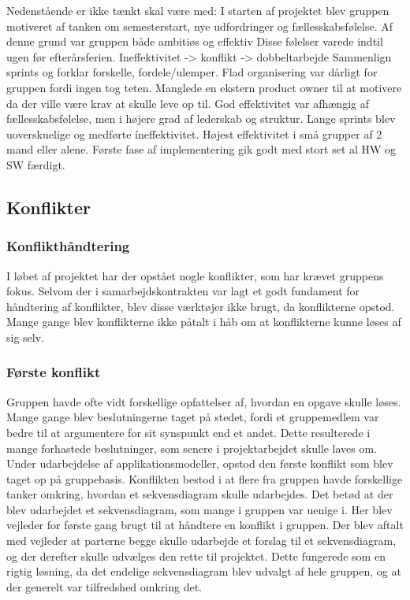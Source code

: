 Nedenstående er ikke tænkt skal være med:
I starten af projektet blev gruppen motiveret af tanken om semesterstart, nye udfordringer og fællesskabsfølelse. Af denne grund var gruppen både ambitiøs og effektiv
Disse følelser varede indtil ugen før efterårsferien.
Ineffektivitet -> konflikt -> dobbeltarbejde
Sammenlign sprints og forklar forskelle, fordele/ulemper.
Flad organisering var dårligt for gruppen fordi ingen tog teten. Manglede en ekstern product owner til at motivere da der ville være krav at skulle leve op til. 
God effektivitet var afhængig af fællesskabsfølelse, men i højere grad af lederskab og struktur.
Lange sprints blev uoverskuelige og medførte íneffektivitet. 
Højest effektivitet i små grupper af 2 mand eller alene. Første fase af implementering gik godt med stort set al HW og SW færdigt. 

\subsection{Konflikter}
\subsubsection{Konflikthåndtering}
I løbet af projektet har der opstået nogle konflikter, som har krævet gruppens fokus. Selvom der i samarbejdskontrakten var lagt et godt fundament for 
håndtering af konflikter, blev disse værktøjer ikke brugt, da konflikterne opstod. Mange gange blev konflikterne ikke påtalt i håb om at konflikterne kunne 
løses af sig selv. 

\subsubsection{Første konflikt}
Gruppen havde ofte vidt forskellige opfattelser af, hvordan en opgave skulle løses. Mange gange blev beslutningerne taget på stedet, fordi et gruppemedlem var 
bedre til at argumentere for sit synspunkt end et andet. Dette resulterede i mange forhastede beslutninger, som senere i projektarbejdet skulle laves om. 
Under udarbejdelse af applikationsmodeller, opstod den første konflikt som blev taget op på gruppebasis. Konflikten bestod i at flere fra gruppen havde 
forskellige tanker omkring, hvordan et sekvensdiagram skulle udarbejdes. Det betød at der blev udarbejdet et sekvensdiagram, som mange i gruppen var uenige i. 
Her blev vejleder for første gang brugt til at håndtere en konflikt i gruppen. Der blev aftalt med vejleder at parterne begge skulle udarbejde et forslag til 
et sekvensdiagram, og der derefter skulle udvælges den rette til projektet. Dette fungerede som en rigtig løsning, da det endelige sekvensdiagram blev udvalgt 
af hele gruppen, og at der generelt var tilfredshed omkring det.
